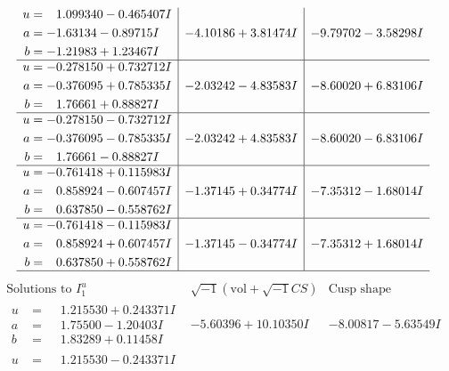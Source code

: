\documentclass[1p]{elsarticle_modified}
\theoremstyle{definition}
\newcommand{\I}{\sqrt{-1}}
\begin{document}
$$\begin{array}{c|c|c}
\begin{aligned}
u &= \phantom{-}1.099340 - 0.465407 I \\
a &= -1.63134 - 0.89715 I \\
b &= -1.21983 + 1.23467 I\end{aligned}
 & -4.10186 + 3.81474 I & -9.79702 - 3.58298 I \\ \hline\begin{aligned}
u &= -0.278150 + 0.732712 I \\
a &= -0.376095 + 0.785335 I \\
b &= \phantom{-}1.76661 + 0.88827 I\end{aligned}
 & -2.03242 - 4.83583 I & -8.60020 + 6.83106 I \\ \hline\begin{aligned}
u &= -0.278150 - 0.732712 I \\
a &= -0.376095 - 0.785335 I \\
b &= \phantom{-}1.76661 - 0.88827 I\end{aligned}
 & -2.03242 + 4.83583 I & -8.60020 - 6.83106 I \\ \hline\begin{aligned}
u &= -0.761418 + 0.115983 I \\
a &= \phantom{-}0.858924 - 0.607457 I \\
b &= \phantom{-}0.637850 - 0.558762 I\end{aligned}
 & -1.37145 + 0.34774 I & -7.35312 - 1.68014 I \\ \hline\begin{aligned}
u &= -0.761418 - 0.115983 I \\
a &= \phantom{-}0.858924 + 0.607457 I \\
b &= \phantom{-}0.637850 + 0.558762 I\end{aligned}
 & -1.37145 - 0.34774 I & -7.35312 + 1.68014 I\\
 \hline 
 \end{array}$$\newpage$$\begin{array}{c|c|c}  
\text{Solutions to }I^u_{1}& \I (\text{vol} + \sqrt{-1}CS) & \text{Cusp shape}\\
 \hline 
\begin{aligned}
u &= \phantom{-}1.215530 + 0.243371 I \\
a &= \phantom{-}1.75500 - 1.20403 I \\
b &= \phantom{-}1.83289 + 0.11458 I\end{aligned}
 & -5.60396 + 10.10350 I & -8.00817 - 5.63549 I \\ \hline\begin{aligned}
u &= \phantom{-}1.215530 - 0.243371 I \\

\end{aligned}
\end{array}$$
\end{document}
